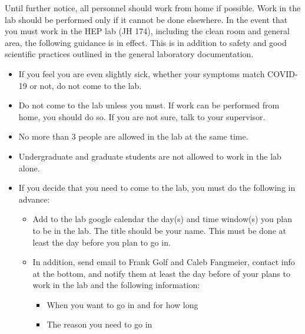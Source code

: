 Until further notice, all personnel should work from home if possible.  Work in the lab should be performed only if it cannot be done elsewhere.  In the event that you must work in the HEP lab (JH 174), including the clean room and general area, the following guidance is in effect.  This is in addition to safety and good scientific practices outlined in the general laboratory documentation.

\begin{itemize}
\item If you feel you are even slightly sick, whether your symptoms match COVID-19 or not, do not come to the lab.
\item Do not come to the lab unless you must. If work can be performed from home, you should do so.  If you are not sure, talk to your supervisor.
\item No more than 3 people are allowed in the lab at the same time.
\item Undergraduate and graduate students are not allowed to work in the lab alone.
\item If you decide that you need to come to the lab, you must do the following in advance:
    \begin{itemize}
    \item Add to the lab google calendar the day(s) and time window(s) you plan to be in the lab.  The title should be your name.  This must be done at least the day before you plan to go in.
    \item In addition, send email to Frank Golf and Caleb Fangmeier, contact info at the bottom, and notify them at least the day before of your plans to work in the lab and the following information:
    
    	    \begin{itemize}
	    	\item When you want to go in and for how long
		\item The reason you need to go in
	    \end{itemize}


\end{itemize}
\end{itemize}
